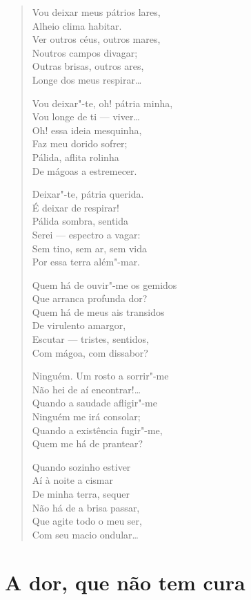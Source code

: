 \begin{verse}
Vou deixar meus pátrios lares,\\
Alheio clima habitar.\\
Ver outros céus, outros mares,\\
Noutros campos divagar;\\
Outras brisas, outros ares,\\
Longe dos meus respirar\ldots{}

Vou deixar"-te, oh! pátria minha,\\
Vou longe de ti --- viver\ldots{}\\
Oh! essa ideia mesquinha,\\
Faz meu dorido sofrer;\\
Pálida, aflita rolinha\\
De mágoas a estremecer.

Deixar"-te, pátria querida.\\
É deixar de respirar!\\
Pálida sombra, sentida\\
Serei --- espectro a vagar:\\
Sem tino, sem ar, sem vida\\
Por essa terra além"-mar.

Quem há de ouvir"-me os gemidos\\
Que arranca profunda dor?\\
Quem há de meus ais transidos\\
De virulento amargor,\\
Escutar --- tristes, sentidos,\\
Com mágoa, com dissabor?

Ninguém. Um rosto a sorrir"-me\\
Não hei de aí encontrar!\ldots{}\\
Quando a saudade afligir"-me\\
Ninguém me irá consolar;\\
Quando a existência fugir"-me,\\
Quem me há de prantear?

Quando sozinho estiver\\
Aí à noite a cismar\\
De minha terra, sequer\\
Não há de a brisa passar,\\
Que agite todo o meu ser,\\
Com seu macio ondular\ldots{}
\end{verse}

\chapter{A dor, que não tem cura}

